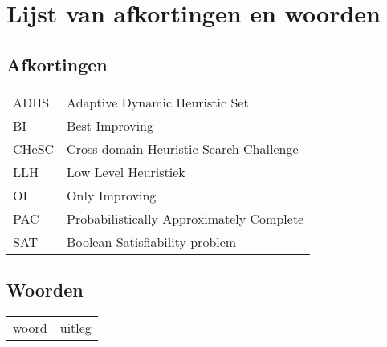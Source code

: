 \chapter*{Lijst van afkortingen en woorden}\label{ch:woorden}
\section*{Afkortingen}
\begin{flushleft}
	\renewcommand{\arraystretch}{1.1}
	\begin{tabularx}{\textwidth}{@{}p{12mm}X@{}}
		ADHS & Adaptive Dynamic Heuristic Set \\
		BI & Best Improving \\
		CHeSC & Cross-domain Heuristic Search Challenge \\
		LLH & Low Level Heuristiek \\
		OI & Only Improving \\
		PAC & Probabilistically Approximately Complete \\
		SAT & Boolean Satisfiability problem \\
	\end{tabularx}
\end{flushleft}

\section*{Woorden}
\begin{flushleft}
	\renewcommand{\arraystretch}{1.1}
	\begin{tabularx}{\textwidth}{@{}p{12mm}X@{}}
		woord & uitleg \\
	\end{tabularx}
\end{flushleft}